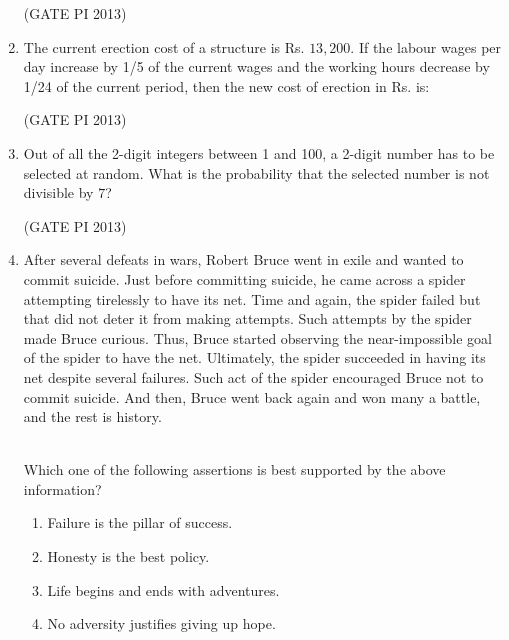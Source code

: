 \documentclass[journal,12pt,onecolumn]{IEEEtran}
\theoremstyle{remark}
\begin{document}
\begin{enumerate}
\hfill (GATE PI 2013)


\item The current erection cost of a structure is Rs. $13{,}200$.  
If the labour wages per day increase by 1/5 of the current wages and the working hours decrease by 1/24 of the current period, then the new cost of erection in Rs. is:
\begin{enumerate}
\end{enumerate}


\hfill (GATE PI 2013)

\item Out of all the 2-digit integers between 1 and 100, a 2-digit number has to be selected at random.  
What is the probability that the selected number is not divisible by $7$?
\begin{enumerate}
\end{enumerate}

\hfill (GATE PI 2013)

\item After several defeats in wars, Robert Bruce went in exile and wanted to commit suicide. Just before committing suicide, he came across a spider attempting tirelessly to have its net. Time and again, the spider failed but that did not deter it from making attempts. Such attempts by the spider made Bruce curious. Thus, Bruce started observing the near-impossible goal of the spider to have the net. Ultimately, the spider succeeded in having its net despite several failures. Such act of the spider encouraged Bruce not to commit suicide. And then, Bruce went back again and won many a battle, and the rest is history.  \\\  

Which one of the following assertions is best supported by the above information? \\
\begin{enumerate}
\item Failure is the pillar of success.
\item Honesty is the best policy.
\item Life begins and ends with adventures.
\item No adversity justifies giving up hope. 
\end{enumerate}


\end{enumerate}
\end{document}
